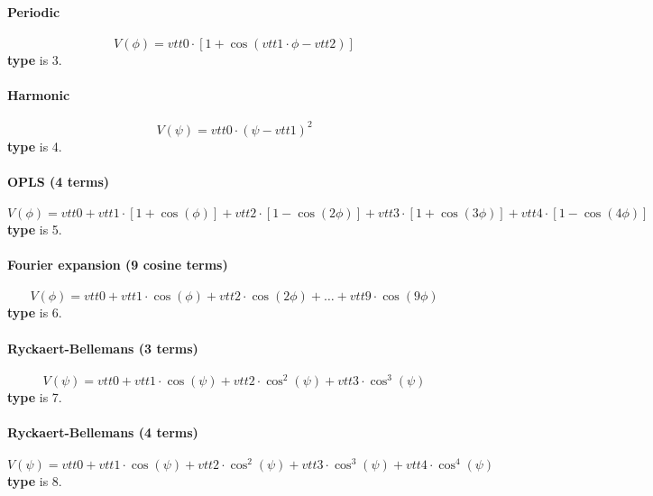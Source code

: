 \documentclass[12pt,letterpaper]{article}
\begin{document}
\paragraph{Periodic}
\begin{equation}
V(\phi) = vtt0\cdot[1+\cos(vtt1\cdot\phi-vtt2)]
\end{equation}
{\bf type} is 3.

\paragraph{Harmonic}
\begin{equation}
V(\psi) = vtt0\cdot(\psi-vtt1)^2
\end{equation}
{\bf type} is 4.

\paragraph{OPLS (4 terms)}
\begin{equation}
V(\phi) = vtt0 + vtt1\cdot[1+\cos(\phi)] + vtt2\cdot[1-\cos(2\phi)]
+ vtt3\cdot[1+\cos(3\phi)] + vtt4\cdot[1-\cos(4\phi)]
\end{equation}
{\bf type} is 5.

\paragraph{Fourier expansion (9 cosine terms)}
\begin{equation}
V(\phi) = vtt0 + vtt1\cdot\cos(\phi) + vtt2\cdot\cos(2\phi) + \dots
+ vtt9\cdot\cos(9\phi)
\end{equation}
{\bf type} is 6.

\paragraph{Ryckaert-Bellemans (3 terms)}
\begin{equation}
V(\psi) = vtt0 + vtt1\cdot\cos(\psi) + vtt2\cdot\cos^2(\psi) + vtt3\cdot\cos^3(\psi)
\end{equation}
{\bf type} is 7.

\paragraph{Ryckaert-Bellemans (4 terms)}
\begin{equation}
V(\psi) = vtt0 + vtt1\cdot\cos(\psi) + vtt2\cdot\cos^2(\psi) + vtt3\cdot\cos^3(\psi) + vtt4\cdot\cos^4(\psi)
\end{equation}
{\bf type} is 8.
\end{document}
